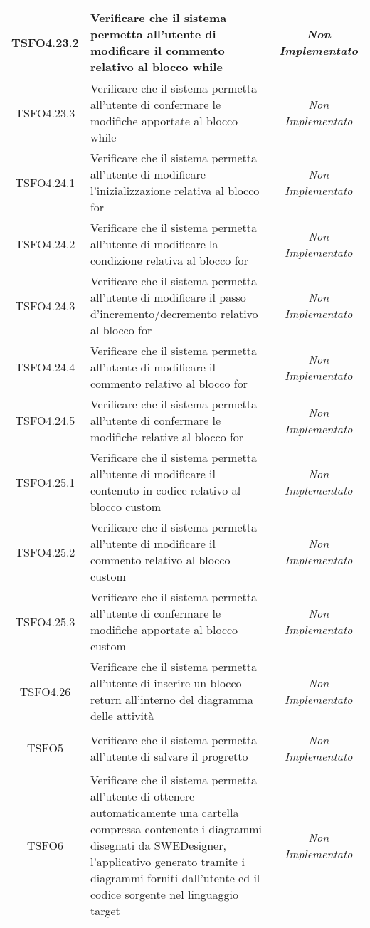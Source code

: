 \begin{longtable}{|c|>{}m{8cm}|c|}
\hypertarget{TSFO4.23.2}{TSFO4.23.2} & Verificare che il sistema permetta all'utente di modificare il commento relativo al blocco while & \textit{Non Implementato}\\ \hline
\hypertarget{TSFO4.23.3}{TSFO4.23.3} & Verificare che il sistema permetta all'utente di confermare le modifiche apportate al blocco while & \textit{Non Implementato}\\ \hline
\hypertarget{TSFO4.24.1}{TSFO4.24.1} & Verificare che il sistema permetta all'utente di modificare l'inizializzazione relativa al blocco for & \textit{Non Implementato}\\ \hline
\hypertarget{TSFO4.24.2}{TSFO4.24.2} & Verificare che il sistema permetta all'utente di modificare la condizione relativa al blocco for & \textit{Non Implementato}\\ \hline
\hypertarget{TSFO4.24.3}{TSFO4.24.3} & Verificare che il sistema permetta all'utente di modificare il passo d'incremento/decremento relativo al blocco for & \textit{Non Implementato}\\ \hline
\hypertarget{TSFO4.24.4}{TSFO4.24.4} & Verificare che il sistema permetta all'utente di modificare il commento relativo al blocco for & \textit{Non Implementato}\\ \hline
\hypertarget{TSFO4.24.5}{TSFO4.24.5} & Verificare che il sistema permetta all'utente di confermare le modifiche relative al blocco for & \textit{Non Implementato}\\ \hline
\hypertarget{TSFO4.25.1}{TSFO4.25.1} & Verificare che il sistema permetta all'utente di modificare il contenuto in codice relativo al blocco custom & \textit{Non Implementato}\\ \hline
\hypertarget{TSFO4.25.2}{TSFO4.25.2} & Verificare che il sistema permetta all'utente di modificare il commento relativo al blocco custom & \textit{Non Implementato}\\ \hline
\hypertarget{TSFO4.25.3}{TSFO4.25.3} & Verificare che il sistema permetta all'utente di confermare le modifiche apportate al blocco custom & \textit{Non Implementato}\\ \hline
\hypertarget{TSFO4.26}{TSFO4.26} & Verificare che il sistema permetta all'utente di inserire un blocco return all'interno del diagramma delle attività & \textit{Non Implementato}\\ \hline
\hypertarget{TSFO5}{TSFO5} & Verificare che il sistema permetta all'utente di salvare il progretto & \textit{Non Implementato}\\ \hline
\hypertarget{TSFO6}{TSFO6} & Verificare che il sistema permetta all'utente di ottenere automaticamente una cartella compressa contenente i diagrammi disegnati da SWEDesigner, l'applicativo generato tramite i diagrammi forniti dall'utente ed il codice sorgente nel linguaggio target & \textit{Non Implementato}\\ \hline

\end{longtable}
